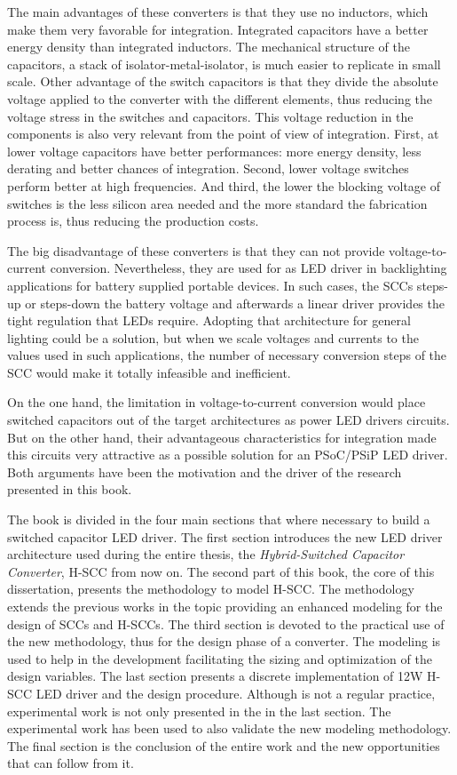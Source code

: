 The main advantages of these converters is that they use no inductors, which make them very favorable for integration. Integrated capacitors have a better energy density than integrated inductors. The mechanical structure of the capacitors, a stack of isolator-metal-isolator, is much easier to replicate in small scale. 
Other advantage of the switch capacitors is that they divide the absolute voltage applied to the converter with the different elements, thus reducing the voltage stress in the switches and capacitors. This voltage reduction in the components is also very relevant from the point of view of integration. First, at lower voltage capacitors have better performances: more energy density, less derating and better chances of integration. Second, lower voltage switches perform better at high frequencies. And third, the lower the blocking voltage of switches is the less silicon area needed and the more standard the fabrication process is, thus reducing the production costs. 

The big disadvantage of these converters is that they can not provide voltage-to-current conversion. Nevertheless, they are used for as LED driver in backlighting applications for battery supplied portable devices. In such cases, the SCCs steps-up or steps-down the battery voltage and afterwards a linear driver   provides the tight regulation that LEDs require. Adopting that architecture for general lighting could be a solution, but when we scale voltages and currents to the values used in such applications,  the number of necessary conversion steps of the SCC would make it totally infeasible and inefficient. 

On the one hand, the limitation in voltage-to-current conversion would place switched capacitors out of the target architectures as power LED drivers circuits. But on the other hand, their advantageous characteristics for integration made this circuits very attractive as a possible solution for an PSoC/PSiP LED driver. Both arguments have been the motivation and the driver of the research presented in this book. 

The book is divided in the four main sections that where necessary to build a switched capacitor LED driver. The first section introduces the new LED driver architecture used during the entire thesis, the \emph{Hybrid-Switched Capacitor Converter}, H-SCC from now on. The second part of this book, the core of this dissertation, presents the methodology to model H-SCC. The methodology extends the previous works in the topic providing an enhanced modeling for the design of SCCs and H-SCCs. The third section is devoted to the practical use of the new methodology, thus for the design phase of a converter. The modeling is used  to help in the development facilitating the sizing and optimization of the design variables. The last section presents a discrete implementation of 12W H-SCC LED driver and the design procedure. Although is not a regular practice, experimental work is not only presented in the in the last section. The experimental work has been used to also validate the new modeling methodology. The final section is the conclusion of the entire work and the new opportunities that can follow from it.   


